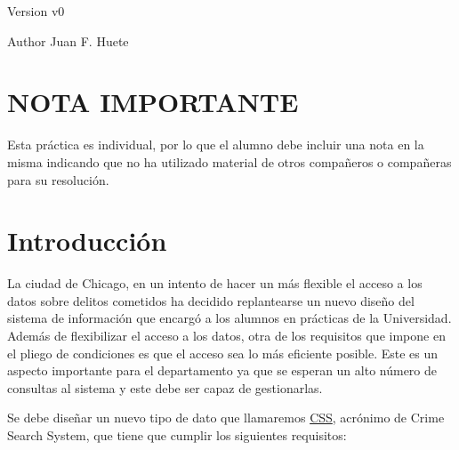 \begin{DoxyVersion}{Version}
v0 
\end{DoxyVersion}
\begin{DoxyAuthor}{Author}
Juan F. Huete
\end{DoxyAuthor}
\hypertarget{index_NOTA}{}\section{N\+O\+T\+A I\+M\+P\+O\+R\+T\+A\+N\+T\+E}\label{index_NOTA}
Esta práctica es individual, por lo que el alumno debe incluir una nota en la misma indicando que no ha utilizado material de otros compañeros o compañeras para su resolución. \hypertarget{index_intro_sec}{}\section{Introducción}\label{index_intro_sec}
La ciudad de Chicago, en un intento de hacer un más flexible el acceso a los datos sobre delitos cometidos ha decidido replantearse un nuevo diseño del sistema de información que encargó a los alumnos en prácticas de la Universidad. Además de flexibilizar el acceso a los datos, otra de los requisitos que impone en el pliego de condiciones es que el acceso sea lo más eficiente posible. Este es un aspecto importante para el departamento ya que se esperan un alto número de consultas al sistema y este debe ser capaz de gestionarlas.

Se debe diseñar un nuevo tipo de dato que llamaremos \hyperlink{classCSS}{C\+S\+S}, acrónimo de Crime Search System, que tiene que cumplir los siguientes requisitos\+:

